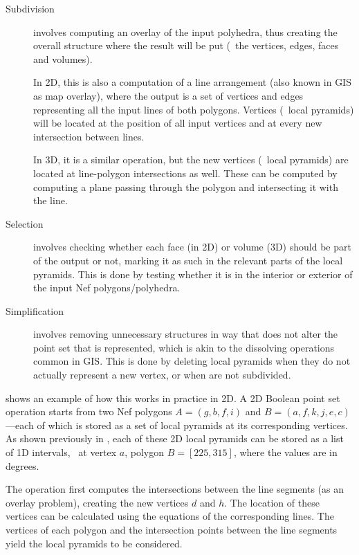 \begin{description}

\item[Subdivision] involves computing an overlay of the input polyhedra, thus creating the overall structure where the result will be put (\ie\ the vertices, edges, faces and volumes).

In 2D, this is also a computation of a line arrangement (also known in GIS as map overlay), where the output is a set of vertices and edges representing all the input lines of both polygons.
Vertices (\ie\ local pyramids) will be located at the position of all input vertices and at every new intersection between lines.

In 3D, it is a similar operation, but the new vertices (\ie\ local pyramids) are located at line-polygon intersections as well.
These can be computed by computing a plane passing through the polygon and intersecting it with the line.

\item[Selection] involves checking whether each face (in 2D) or volume (3D) should be part of the output or not, marking it as such in the relevant parts of the local pyramids.
This is done by testing whether it is in the interior or exterior of the input Nef polygons/polyhedra.

\item[Simplification] involves removing unnecessary structures in way that does not alter the point set that is represented, which is akin to the dissolving operations common in GIS\@.
This is done by deleting local pyramids when they do not actually represent a new vertex, or when are not subdivided.

\end{description}

 shows an example of how this works in practice in 2D.
A 2D Boolean point set operation starts from two Nef polygons \(A = (g, b, f, i)\) and \(B = (a, f, k, j, e, c)\)---each of which is stored as a set of local pyramids at its corresponding vertices.
As shown previously in , each of these 2D local pyramids can be stored as a list of 1D intervals, \eg\ at vertex \(a\), polygon \(B = [225, 315]\), where the values are in degrees.

The operation first computes the intersections between the line segments (as an overlay problem), creating the new vertices \(d\) and \(h\).
The location of these vertices can be calculated using the equations of the corresponding lines.
The vertices of each polygon and the intersection points between the line segments yield the local pyramids to be considered.

